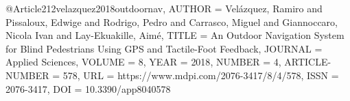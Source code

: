 @Article{212velazquez2018outdoornav,
AUTHOR = {Velázquez, Ramiro and Pissaloux, Edwige and Rodrigo, Pedro and Carrasco, Miguel and Giannoccaro, Nicola Ivan and Lay-Ekuakille, Aimé},
TITLE = {An Outdoor Navigation System for Blind Pedestrians Using GPS and Tactile-Foot Feedback},
JOURNAL = {Applied Sciences},
VOLUME = {8},
YEAR = {2018},
NUMBER = {4},
ARTICLE-NUMBER = {578},
URL = {https://www.mdpi.com/2076-3417/8/4/578},
ISSN = {2076-3417},
DOI = {10.3390/app8040578}
}